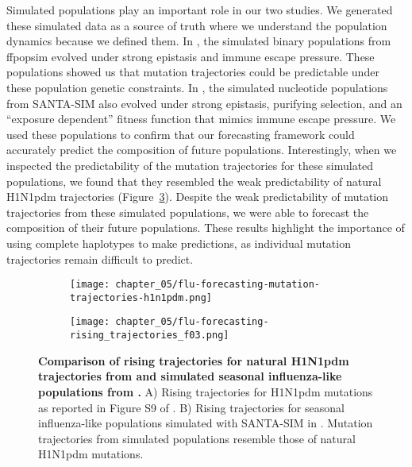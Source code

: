 Simulated populations play an important role in our two studies.
We generated these simulated data as a source of truth where we understand the population dynamics because we defined them.
In \citet{Barrat-Charlaix2020}, the simulated binary populations from ffpopsim \citep{Zanini2012} evolved under strong epistasis and immune escape pressure.
These populations showed us that mutation trajectories could be predictable under these population genetic constraints.
In \citet{Huddleston2020}, the simulated nucleotide populations from SANTA-SIM \citep{Jariani2019} also evolved under strong epistasis, purifying selection, and an ``exposure dependent'' fitness function that mimics immune escape pressure.
We used these populations to confirm that our forecasting framework could accurately predict the composition of future populations.
Interestingly, when we inspected the predictability of the mutation trajectories for these simulated populations, we found that they resembled the weak predictability of natural H1N1pdm trajectories (Figure~\ref{fig:mutation-trajectories-comparison}).
Despite the weak predictability of mutation trajectories from these simulated populations, we were able to forecast the composition of their future populations.
These results highlight the importance of using complete haplotypes to make predictions, as individual mutation trajectories remain difficult to predict.

\begin{figure}
  \begin{subfigure}[b]{0.5\textwidth}
    \centering
    \texttt{[image: chapter\_05/flu-forecasting-mutation-trajectories-h1n1pdm.png]}
    \label{fig:mutation-trajectories-h1n1pdm}
  \end{subfigure}
  \hfill
  \begin{subfigure}[b]{0.4\textwidth}
    \centering
    \texttt{[image: chapter\_05/flu-forecasting-rising\_trajectories\_f03.png]}
    \label{fig:mutation-trajectories-simulated}
  \end{subfigure}

  \caption[{Comparison of rising trajectories for natural H1N1pdm trajectories from \citet{Barrat-Charlaix2020} and simulated seasonal influenza-like populations from \citet{Huddleston2020}.}]{{\bf Comparison of rising trajectories for natural H1N1pdm trajectories from \citet{Barrat-Charlaix2020} and simulated seasonal influenza-like populations from \citet{Huddleston2020}.}
    A) Rising trajectories for H1N1pdm mutations as reported in Figure S9 of \citet{Barrat-Charlaix2020}.
    B) Rising trajectories for seasonal influenza-like populations simulated with SANTA-SIM in \citet{Huddleston2020}.
    Mutation trajectories from simulated populations resemble those of natural H1N1pdm mutations.\label{fig:mutation-trajectories-comparison}
  }
\end{figure}

